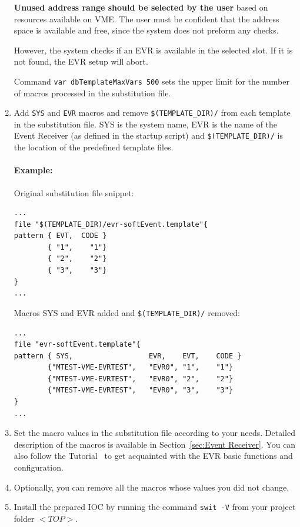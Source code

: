 \documentclass[12pt,a4paper]{article}
\begin{document}
\begin{enumerate}
  \textbf{Unused address range should be selected by the user} based on resources available on VME.
  The user must be confident that the address space is available and free, since the system does not preform any checks. 
  
  However, the system checks if an EVR is available in the selected slot. If it is not found, the EVR setup will abort.
  
  Command \texttt{var dbTemplateMaxVars 500} sets the upper limit for the number of macros processed in the substitution file.
  
\item
  Add \texttt{SYS} and \texttt{EVR} macros and remove \texttt{\$(TEMPLATE\_DIR)/} from each template in the substitution file. SYS is the system name, EVR is the name of the Event Receiver (as defined in the startup script) and \texttt{\$(TEMPLATE\_DIR)/} is the location of the predefined template files. 
  
\paragraph{Example:} 
Original substitution file snippet:

\begin{verbatim}
...
file "$(TEMPLATE_DIR)/evr-softEvent.template"{
pattern { EVT,  CODE }
        { "1",    "1"}
        { "2",    "2"}
        { "3",    "3"}
}
...
\end{verbatim}

 Macros SYS and EVR added and \texttt{\$(TEMPLATE\_DIR)/} removed:

\begin{verbatim}
...
file "evr-softEvent.template"{
pattern { SYS,                  EVR,    EVT,    CODE }
        {"MTEST-VME-EVRTEST",   "EVR0", "1",    "1"}
        {"MTEST-VME-EVRTEST",   "EVR0", "2",    "2"}
        {"MTEST-VME-EVRTEST",   "EVR0", "3",    "3"}
}
...
\end{verbatim}
\item
  Set the macro values in the substitution file according to your needs.
  Detailed description of the macros is available in Section~\ref{sec:Event Receiver}.
  You can also follow the Tutorial~\cite{tutorial} to get acquainted with the EVR basic functions and configuration.
\item
  Optionally, you can remove all the macros whose values you did not
  change.
\item
  Install the prepared IOC by running the command
  \texttt{swit -V} from your project folder $<TOP>$.
\end{enumerate}
\end{document}
